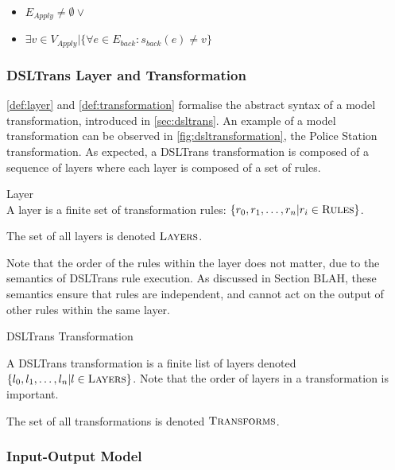 \begin{itemize}
\item $E_{\textit{Apply}} \neq \emptyset \lor$
\item $ \exists v \in V_{\textit{Apply}} | \big\{\forall e \in E_{back}: s_{back}(e) \neq v \big\}$
\end{itemize}



\subsubsection*{DSLTrans Layer and Transformation}

\cref{def:layer} and \cref{def:transformation} formalise the abstract syntax of a model transformation, introduced in \cref{sec:dsltrans}. An example of a model transformation can be observed in \cref{fig:dsltransformation}, the Police Station transformation. As expected, a DSLTrans transformation is composed of a sequence of layers where each layer is composed of a set of rules.

\begin{definition}{Layer\\}
\label{def:layer}
A layer is a finite set of transformation rules: $\{r_0, r_1, \dots, r_n | r_i \in \textsc{Rules}\}$.

The set of all layers is denoted $\textsc{Layers}$. 
\end{definition}

Note that the order of the rules within the layer does not matter, due to the semantics of DSLTrans rule execution. As discussed in Section BLAH, these semantics ensure that rules are independent, and cannot act on the output of other rules within the same layer.

\begin{definition}{DSLTrans Transformation\\}
\label{def:transformation}

A DSLTrans transformation is a finite list of layers denoted $\{l_0, l_1, \dots, l_n | l \in \textsc{Layers}\}$. Note that the order of layers in a transformation is important.

The set of all transformations is denoted $\textsc{Transforms}$.



\end{definition}



\subsubsection*{Input-Output Model}

